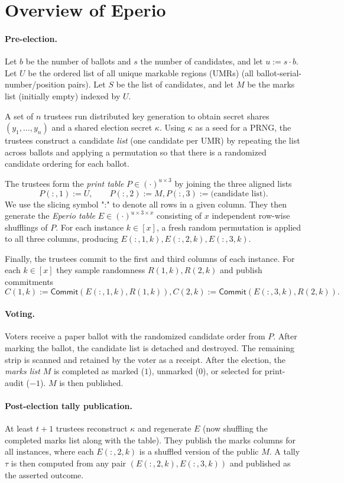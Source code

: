 \section{Overview of Eperio~\cite{ECHA10}}
\label{sec:eperio-exp}
\paragraph{Pre-election.}
Let $b$ be the number of ballots and $s$ the number of candidates, and let $u := s\cdot b$.
Let $U$ be the ordered list of all unique markable regions (UMRs) (all ballot-serial-number/position pairs).
Let $S$ be the list of candidates, and let $M$ be the marks list (initially empty) indexed by $U$.

A set of $n$ trustees run distributed key generation to obtain secret shares $(y_1,\dots,y_n)$ and a shared election secret $\kappa$.
Using $\kappa$ as a seed for a PRNG, the trustees construct a candidate \emph{list} (one candidate per UMR) by repeating the list
across ballots and applying a permutation so that there is a randomized candidate ordering for each ballot.

The trustees form the \emph{print table} $P\in(\cdot)^{u\times 3}$ by joining the three aligned lists
\[
P(:,1):=U,\qquad P(:,2):=M, 
P(:,3):=\text{(candidate list)}.
\]
We use the slicing symbol ":" to denote all rows in a given column.
They then generate the \emph{Eperio table} $E\in(\cdot)^{u\times 3\times x}$ consisting of $x$ independent
row-wise shufflings of $P$.
For each instance $k\in[x]$, a fresh random permutation is applied
to all three columns, producing $E(:,1,k),E(:,2,k),E(:,3,k)$.

Finally, the trustees commit to the first and third columns of each instance.
For each $k\in[x]$ they sample randomness $R(1,k),R(2,k)$ and publish commitments
\[
C(1,k) := \mathsf{Commit}(E(:,1,k),R(1,k)),
C(2,k) := \mathsf{Commit}(E(:,3,k),R(2,k)).
\]

\paragraph{Voting.}
Voters receive a paper ballot with the randomized candidate order from $P$.
After marking the ballot, the candidate list is detached and destroyed.
The remaining strip is scanned and retained by the voter as a receipt. 
After the election, the \emph{marks list} $M$ is completed as marked ($1$), unmarked ($0$), or selected for print-audit ($-1$). 
$M$ is then published.

\paragraph{Post-election tally publication.}
At least $t{+}1$ trustees reconstruct $\kappa$ and regenerate $E$ (now shuffling the completed marks list along with the table).
They publish the marks columns for all instances, where each $E(:,2,k)$ is a shuffled version of the public $M$. 
A tally $\tau$ is then computed from any pair $(E(:,2,k),E(:,3,k))$ and published as the asserted outcome. 

